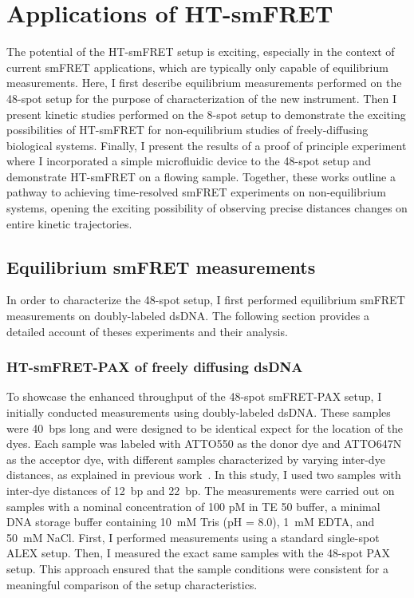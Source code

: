 \chapter{Applications of HT-smFRET}
\label{chpt:HT-smFRET_applications}

The potential of the \ac{HT-smFRET} setup is exciting, especially in the context of current \ac{smFRET} applications, which are typically only capable of equilibrium measurements.
Here, I first describe equilibrium measurements performed on the 48-spot setup for the purpose of characterization of the new instrument.
Then I present kinetic studies performed on the 8-spot setup to demonstrate the exciting possibilities of \ac{HT-smFRET} for non-equilibrium studies of freely-diffusing biological systems.
Finally, I present the results of a proof of principle experiment where I incorporated a simple microfluidic device to the 48-spot setup and demonstrate \ac{HT-smFRET} on a flowing sample.
Together, these works outline a pathway to achieving time-resolved \ac{smFRET} experiments on non-equilibrium systems, opening the exciting possibility of observing precise distances changes on entire kinetic trajectories.

\section{Equilibrium smFRET measurements}
\label{sec:HT-smFRET_measurements}

In order to characterize the 48-spot setup, I first performed equilibrium \ac{smFRET} measurements on doubly-labeled \ac{dsDNA}.
The following section provides a detailed account of theses experiments and their analysis.

\subsection{HT-smFRET-PAX of freely diffusing dsDNA}
\label{sec:HT-smFRET_measurements_DNA}

To showcase the enhanced throughput of the 48-spot smFRET-PAX setup, I initially conducted measurements using doubly-labeled \ac{dsDNA}. These samples were 40~\ac{bp}s long and were designed to be identical expect for the location of the dyes.  
Each sample was labeled with ATTO550 as the donor dye and ATTO647N as the acceptor dye, with different samples characterized by varying inter-dye distances, as explained in previous work~\cite{ingargiola_PLOS1_2016}. 
In this study, I used two samples with inter-dye distances of 12~\ac{bp} and 22~\ac{bp}\cite{ingargiola_JCP_2018}. 
The measurements were carried out on samples with a nominal concentration of 100 pM in TE 50 buffer, a minimal DNA storage buffer containing 10~mM Tris (pH = 8.0), 1~mM EDTA, and 50~mM NaCl. 
First, I performed measurements using a standard single-spot \ac{ALEX} setup. 
Then, I measured the exact same samples with the 48-spot PAX setup.
This approach ensured that the sample conditions were consistent for a meaningful comparison of the setup characteristics.

